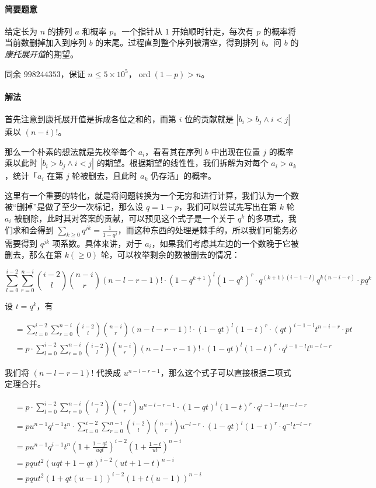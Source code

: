 \documentclass[12pt]{ctexart}
\theoremstyle{theorem}
\theoremstyle{theorem}
\begin{document}
\paragraph{简要题意} 给定长为 $n$ 的排列 $a$ 和概率 $p$。一个指针从 $1$ 开始顺时针走，每次有 $p$ 的概率将当前数删掉加入到序列 $b$ 的末尾。过程直到整个序列被清空，得到排列 $b$。问 $b$ 的\emph{康托展开值}的期望。

同余 $998244353$，保证 $n\le 5\times 10^5$，$\operatorname{ord} (1-p) > n$。

\paragraph{解法}

首先注意到康托展开值是拆成各位之和的，而第 $i$ 位的贡献就是 $| b_i>b_j \land i < j |$ 乘以 $(n-i)!$。

那么一个朴素的想法就是先枚举每个 $a_i$，看看其在序列 $b$ 中出现在位置 $j$ 的概率乘以此时 $| b_i>b_j \land i < j |$ 的期望。根据期望的线性性，我们拆解为对每个 $a_i>a_k$，统计「$a_i$ 在第 $j$ 轮被删去，且此时 $a_k$ 仍存活」的概率。

这里有一个重要的转化，就是将问题转换为一个无穷和进行计算，我们认为一个数被“删掉”是做了至少一次标记，那么设 $q=1-p$，我们可以尝试先写出在第 $k$ 轮 $a_i$ 被删除，此时其对答案的贡献，可以预见这个式子是一个关于 $q^k$ 的多项式，我们求和会得到 $\sum_{k\ge 0} q^{jk} = \frac 1{1-q^j}$，而这种东西的处理是棘手的，所以我们可能务必需要得到 $q^{jk}$ 项系数。具体来讲，对于 $a_i$，如果我们考虑其左边的一个数晚于它被删去，那么在第 $k(\ge 0)$ 轮，可以枚举剩余的数被删去的情况：

$$
\sum_{l=0}^{i-2} \sum_{r=0}^{n-i} \binom {i-2}l \binom{n-i}r (n-l-r-1)! \cdot (1-q^{k+1})^l (1-q^k)^r \cdot q^{(k+1)(i-1-l)} q^{k(n-i-r)} \cdot pq^k
$$

设 $t=q^k$，有

\begin{align*}
& = \sum_{l=0}^{i-2} \sum_{r=0}^{n-i} \binom {i-2}l \binom{n-i}r (n-l-r-1)! \cdot (1-qt)^l (1-t)^r \cdot {(qt)}^{i-1-l} t^{n-i-r} \cdot pt\\
& = p\cdot \sum_{l=0}^{i-2} \sum_{r=0}^{n-i} \binom {i-2}l \binom{n-i}r (n-l-r-1)! \cdot (1-qt)^l (1-t)^r \cdot q^{i-1-l} t^{n-l-r}
\end{align*}

我们将 $(n-l-r-1)!$ 代换成 $u^{n-l-r-1}$，那么这个式子可以直接根据二项式定理合并。

\begin{align*}
& = p\cdot \sum_{l=0}^{i-2} \sum_{r=0}^{n-i} \binom {i-2}l \binom{n-i}r u^{n-l-r-1} \cdot (1-qt)^l (1-t)^r \cdot q^{i-1-l} t^{n-l-r}\\
& = p u^{n-1} q^{i-1} t^n\cdot \sum_{l=0}^{i-2} \sum_{r=0}^{n-i} \binom {i-2}l \binom{n-i}r u^{-l-r} \cdot (1-qt)^l (1-t)^r \cdot q^{-l} t^{-l-r}\\
& = p u^{n-1} q^{i-1} t^n \left( 1 + \frac{1-qt}{uqt} \right)^{i-2} \left( 1 + \frac{1-t}{ut} \right)^{n-i}\\
& = pq u t^2 \left( uqt + 1-qt \right)^{i-2} \left( ut + 1-t \right)^{n-i}\\
& = pq u t^2 (1+qt(u-1))^{i-2} (1+t(u-1))^{n-i}
\end{align*}
\end{document}
